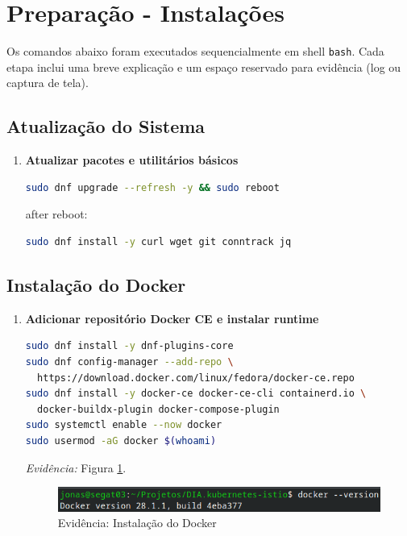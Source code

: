 \documentclass[9pt,a4paper,twocolumn,twoside]{tau-class/tau}
\begin{document}
\section{Preparação - Instalações}
\label{sec:passoapasso}
Os comandos abaixo foram executados sequencialmente em shell \texttt{bash}. Cada
etapa inclui uma breve explicação e um espaço reservado para evidência (log ou
captura de tela).

\subsection{Atualização do Sistema}
\begin{enumerate}[label=\arabic*.]
  \item \textbf{Atualizar pacotes e utilitários básicos}
\begin{lstlisting}[language=Bash]
sudo dnf upgrade --refresh -y && sudo reboot
\end{lstlisting}
    after reboot:
\begin{lstlisting}[language=Bash]
sudo dnf install -y curl wget git conntrack jq
\end{lstlisting}
\end{enumerate}

\subsection{Instalação do Docker}
\begin{enumerate}[label=\arabic*.]
    \item\textbf{Adicionar repositório Docker CE e instalar runtime}

\begin{lstlisting}[language=Bash]
sudo dnf install -y dnf-plugins-core
sudo dnf config-manager --add-repo \
  https://download.docker.com/linux/fedora/docker-ce.repo
sudo dnf install -y docker-ce docker-ce-cli containerd.io \
  docker-buildx-plugin docker-compose-plugin
sudo systemctl enable --now docker
sudo usermod -aG docker $(whoami)
\end{lstlisting}
\textit{Evidência:} Figura \ref{fig:docker}.\\

\begin{figure}[h]
    \centering
    \includegraphics[width=1\linewidth]{figures/evidence-docker}
    \caption{Evidência: Instalação do Docker}
    \label{fig:docker}
\end{figure}
\end{enumerate}
\end{document}
